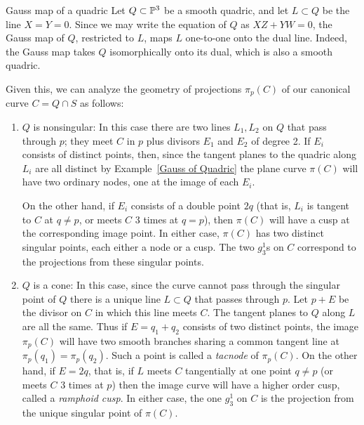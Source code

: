 \begin{example} Gauss map of a quadric
 Let $Q\subset \PP^3$ be a smooth quadric, and let $L\subset Q$ be the line $X=Y =0$. Since we may write the equation of $Q$ as $XZ+YW = 0$, the Gauss map of $Q$, restricted to $L$, maps $L$ one-to-one onto the dual line. Indeed, the Gauss map takes $Q$ isomorphically onto its dual, which is also a smooth quadric.
\end{example}

Given this, we can analyze the geometry of projections $\pi_p(C)$ of our canonical curve $C = Q \cap S$ as follows:

\begin{enumerate}
\item $Q$ is nonsingular:
In this case there are two lines $L_1, L_2$ on $Q$ that pass through $p$; they meet $C$ in $p$ plus divisors $E_1$ and $E_2$ of degree 2. If $E_i$ consists of distinct points, then, since the tangent planes to the quadric along $L_i$ are all distinct by Example~\ref{Gauss of Quadric} the plane curve $\pi(C)$ will have two ordinary nodes, one at the image of each $E_i$.

On the other hand, if $E_i$ consists of a double point $2q$ (that is, $L_i$ is tangent to $C$ at $q\neq p$, or meets $C$ 3 times at $q = p$), then $\pi(C)$ will have a cusp at the corresponding image point. 
In either case, $\pi(C)$ has two distinct singular points, each either a node or a cusp. The two $g^1_3$s on $C$ correspond to the projections from these singular points.

\item $Q$ is a cone:
In this case, since the curve cannot pass through the singular point of $Q$ there is a unique line $L\subset Q$ that passes through $p$. Let $p+E$ be the divisor on $C$ in which this line meets $C$. The tangent planes to $Q$ along $L$ are all the same. Thus if $E = q_1+q_2$ consists of two distinct points, the image $\pi_p(C)$ will have two smooth branches sharing a common tangent line at
$\pi_p(q_1) = \pi_p(q_2)$. Such a point is called a \emph{tacnode} of $\pi_p(C)$. On the other hand, if $E= 2q$, that is, if $L$ meets $C$ tangentially at one point $q\neq p$ (or meets $C$ 3 times at $p$) then the image curve will have a higher order cusp, called a \emph{ramphoid cusp}. In either case, the one $g^1_3$ on $C$ is the projection from the unique singular point of $\pi(C)$.
\end{enumerate}



